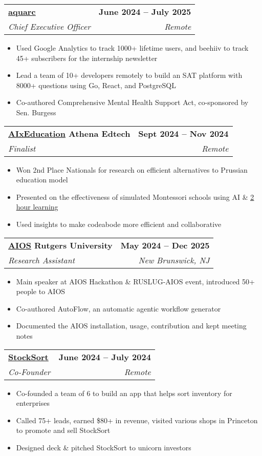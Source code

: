 \documentclass[letterpaper,11pt]{article}
\makeatletter
\newcommand{\resumeItem}[1]{
  \item\small{
    {#1 \vspace{-2pt}}
  }
}
\newcommand{\resumeSubheading}[4]{
  \vspace{-2pt}\item
   \begin{tabular*}{1.0\textwidth}[t]{l@{\extracolsep{\fill}}r}
      \textbf{#1} & \textbf{\small #2} \\
      \textit{\small#3} & \textit{\small #4} \\
    \end{tabular*}\vspace{-7pt}
}
\newcommand{\resumeItemListStart}{\begin{itemize}}
\newcommand{\resumeItemListEnd}{\end{itemize}\vspace{-5pt}}
\makeatother
\begin{document}
    \resumeSubheading
      {\href{https://aquarc.org}{\underline{aquarc}}}{June 2024 -- July 2025}
      {Chief Executive Officer}{Remote}
      \resumeItemListStart
        \resumeItem{Used Google Analytics to track 1000+ lifetime users, and beehiiv to track 45+ subscribers for the internship newsletter}
        \resumeItem{Lead a team of 10+ developers remotely to build an SAT platform with 8000+ questions using Go, React, and PostgreSQL}
        \resumeItem{Co-authored Comprehensive Mental Health Support Act, co-sponsored by Sen. Burgess}
    \resumeItemListEnd

   \resumeSubheading
     {\href{https://hbsp.harvard.edu/inspiring-minds/how-students-are-actually-using-generative-ai}{\underline{AIxEducation}} Athena Edtech}{Sept 2024 -- Nov 2024}
     {Finalist}{Remote}
     \resumeItemListStart
     \resumeItem{Won 2nd Place Nationals for research on efficient alternatives to Prussian education model}
     \resumeItem{Presented on the effectiveness of simulated Montessori schools using AI \& \href{https://2hourlearning.com/}{\underline{2 hour learning}}}
     \resumeItem{Used insights to make codeabode more efficient and collaborative}
   \resumeItemListEnd

   \resumeSubheading
     {\href{https://github.com/agiresearch/AIOS}{\underline{AIOS}} Rutgers University}{May 2024 -- Dec 2025}
     {Research Assistant}{New Brunswick, NJ}
     \resumeItemListStart
     \resumeItem{Main speaker at AIOS Hackathon \& RUSLUG-AIOS event, introduced 50+ people to AIOS}
     \resumeItem{Co-authored AutoFlow, an automatic agentic workflow generator}
     \resumeItem{Documented the AIOS installation, usage, contribution and kept meeting notes}
   \resumeItemListEnd

    \resumeSubheading
      {\href{https://web.archive.org/web/20250119183417if_/https://stocksort.net/}{\underline{StockSort}}}{June 2024 -- July 2024}
      {Co-Founder}{Remote}
      \resumeItemListStart
        \resumeItem{Co-founded a team of 6 to build an app that helps sort inventory for enterprises}
        \resumeItem{Called 75+ leads, earned \$80+ in revenue, visited various shops in Princeton to promote and sell StockSort}
        \resumeItem{Designed deck \& pitched StockSort to unicorn investors}
      \resumeItemListEnd

    

\end{document}
